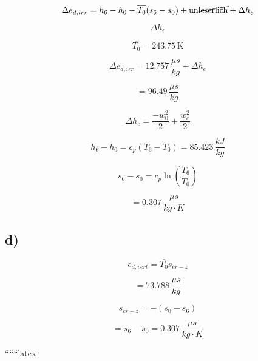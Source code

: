 \[
\Delta e_{d,irr} = h_6 - h_0 - \overline{T_0} (s_6 - s_0) + \cancel{\text{unleserlich}} + \Delta h_e
\]

\[
\Delta h_e
\]

\[
\overline{T_0} = 243.75 \, \text{K}
\]

\[
\Delta e_{d,irr} = 12.757 \, \frac{\mu s}{kg} + \Delta h_e
\]

\[
= 96.49 \, \frac{\mu s}{kg}
\]

\[
\Delta h_e = \frac{-w_0^2}{2} + \frac{w_c^2}{2}
\]

\[
h_6 - h_0 = c_p (T_6 - T_0) = 85.423 \, \frac{kJ}{kg}
\]

\[
s_6 - s_0 = c_p \ln \left( \frac{T_6}{T_0} \right)
\]

\[
= 0.307 \, \frac{\mu s}{kg \cdot K}
\]

\subsection*{d)}

\[
e_{d,vert} = \overline{T_0} s_{er-z}
\]

\[
= 73.788 \, \frac{\mu s}{kg}
\]

\[
s_{er-z} = -(s_0 - s_6)
\]

\[
= s_6 - s_0 = 0.307 \, \frac{\mu s}{kg \cdot K}
\]

``````latex


